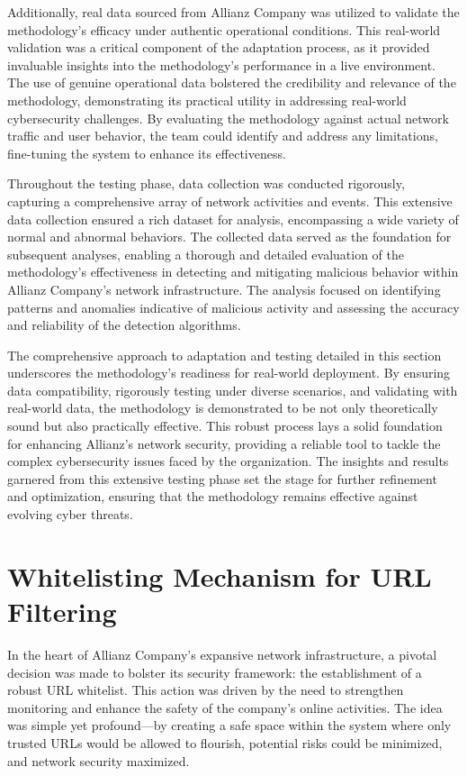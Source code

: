 Additionally, real data sourced from Allianz Company was utilized to validate the methodology's efficacy under authentic operational conditions. This real-world validation was a critical component of the adaptation process, as it provided invaluable insights into the methodology's performance in a live environment. The use of genuine operational data bolstered the credibility and relevance of the methodology, demonstrating its practical utility in addressing real-world cybersecurity challenges. By evaluating the methodology against actual network traffic and user behavior, the team could identify and address any limitations, fine-tuning the system to enhance its effectiveness.

Throughout the testing phase, data collection was conducted rigorously, capturing a comprehensive array of network activities and events. This extensive data collection ensured a rich dataset for analysis, encompassing a wide variety of normal and abnormal behaviors. The collected data served as the foundation for subsequent analyses, enabling a thorough and detailed evaluation of the methodology's effectiveness in detecting and mitigating malicious behavior within Allianz Company’s network infrastructure. The analysis focused on identifying patterns and anomalies indicative of malicious activity and assessing the accuracy and reliability of the detection algorithms.

The comprehensive approach to adaptation and testing detailed in this section underscores the methodology's readiness for real-world deployment. By ensuring data compatibility, rigorously testing under diverse scenarios, and validating with real-world data, the methodology is demonstrated to be not only theoretically sound but also practically effective. This robust process lays a solid foundation for enhancing Allianz's network security, providing a reliable tool to tackle the complex cybersecurity issues faced by the organization. The insights and results garnered from this extensive testing phase set the stage for further refinement and optimization, ensuring that the methodology remains effective against evolving cyber threats.

\section{Whitelisting Mechanism for URL Filtering}
In the heart of Allianz Company’s expansive network infrastructure, a pivotal decision was made to bolster its security framework: the establishment of a robust URL whitelist. This action was driven by the need to strengthen monitoring and enhance the safety of the company's online activities. The idea was simple yet profound—by creating a safe space within the system where only trusted URLs would be allowed to flourish, potential risks could be minimized, and network security maximized.


